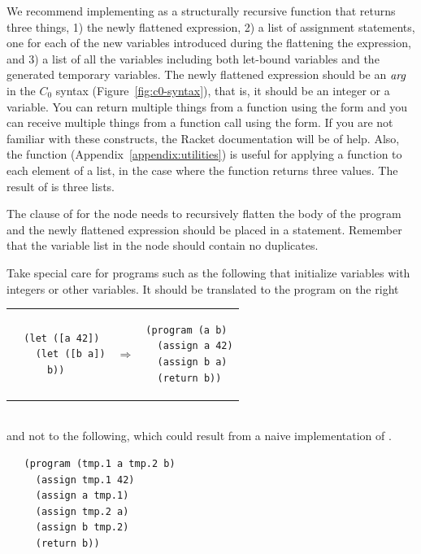\documentclass[11pt]{book}
\begin{document}
We recommend implementing  as a structurally recursive
function that returns three things, 1) the newly flattened expression,
2) a list of assignment statements, one for each of the new variables
introduced during the flattening the expression, and 3) a list of all
the variables including both let-bound variables and the generated
temporary variables.  The newly flattened expression should be an
$\mathit{arg}$ in the $C_0$ syntax (Figure~\ref{fig:c0-syntax}), that is, it
should be an integer or a variable. You can return multiple things
from a function using the  form and you can receive
multiple things from a function call using the 
form. If you are not familiar with these constructs, the Racket
documentation will be of help.
Also, the  function
(Appendix~\ref{appendix:utilities}) is useful for applying a function
to each element of a list, in the case where the function returns
three values. The result of  is three lists.

The clause of  for the  node needs to
recursively flatten the body of the program and the newly flattened
expression should be placed in a  statement. Remember that
the variable list in the  node should contain no duplicates.


Take special care for programs such as the following that initialize
variables with integers or other variables. It should be translated
to the program on the right \\
\begin{tabular}{lll}
\begin{minipage}{0.4\textwidth}
\begin{lstlisting}
  (let ([a 42])
    (let ([b a])
      b))
\end{lstlisting}
\end{minipage}
&
$\Rightarrow$
&
\begin{minipage}{0.4\textwidth}
\begin{lstlisting}
(program (a b)
  (assign a 42)
  (assign b a)
  (return b))
\end{lstlisting}
\end{minipage}
\end{tabular} \\
and not to the following, which could result from a naive
implementation of .
\begin{lstlisting}
   (program (tmp.1 a tmp.2 b)
     (assign tmp.1 42)
     (assign a tmp.1)
     (assign tmp.2 a)
     (assign b tmp.2)
     (return b))
\end{lstlisting}
\end{document}
